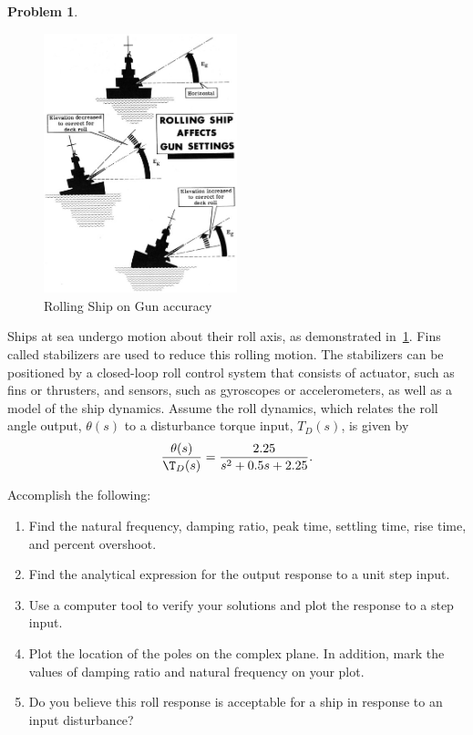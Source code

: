 \documentclass[10pt]{article}
\theoremstyle{definition}
\newtheorem{prob}{Problem}[section]
\newenvironment{subprob}%
{\renewcommand{\theenumi}{\alph{enumi}}\renewcommand{\labelenumi}{(\theenumi)}\begin{enumerate}}%
{\end{enumerate}}%
\begin{document}
\clearpage\newpage
\begin{prob}
    \begin{figure}[h]
        \centering
        \includegraphics[width=0.5\textwidth]{figures/partd-03.jpg}
        \caption{Rolling Ship on Gun accuracy~\label{fig:gun}}
    \end{figure}
    Ships at sea undergo motion about their roll axis, as demonstrated in~\cref{fig:gun}.
    Fins called stabilizers are used to reduce this rolling motion.
    The stabilizers can be positioned by a closed-loop roll control system that consists of actuator, such as fins or thrusters, and sensors, such as gyroscopes or accelerometers, as well as a model of the ship dynamics.
    Assume the roll dynamics, which relates the roll angle output, \( \theta (s) \) to a disturbance torque input, \( T_D(s)\), is given by
    \begin{align}
        \frac{\theta(s)}{\T_D(s)} = \frac{2.25}{s^2 + 0.5 s + 2.25} .
    \end{align}

    Accomplish the following:
    \begin{subprob}
        \item Find the natural frequency, damping ratio, peak time, settling time, rise time, and percent overshoot.
        \item Find the analytical expression for the output response to a unit step input.
        \item Use a computer tool to verify your solutions and plot the response to a step input.
        \item Plot the location of the poles on the complex plane. 
            In addition, mark the values of damping ratio and natural frequency on your plot.
        \item Do you believe this roll response is acceptable for a ship in response to an input disturbance?
    \end{subprob}
\end{prob}
\end{document}

